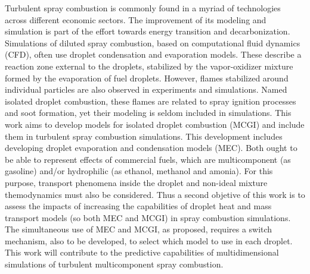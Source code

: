 {

\noindent %
Turbulent spray combustion is commonly found in a myriad of technologies across different economic sectors.
The improvement of its modeling and simulation is part of the effort towards energy transition and decarbonization.
Simulations of diluted spray combustion, based on computational fluid dynamics (CFD), often use droplet condensation and evaporation models.
These describe a reaction zone external to the droplets, stabilized by the vapor-oxidizer mixture formed by the evaporation of fuel droplets.
However, flames stabilized around individual particles are also observed in experiments and simulations.
Named isolated droplet combustion, these flames are related to spray ignition processes and soot formation, yet their modeling is seldom included in simulations. 
This work aims to develop models for isolated droplet combustion (MCGI) and include them in turbulent spray combustion simulations.
This development includes developing droplet evaporation and condensation models (MEC).
Both ought to be able to represent effects of commercial fuels, which are multicomponent (as gasoline) and/or hydrophilic (as ethanol, methanol and amonia).
For this purpose, transport phenomena inside the droplet and non-ideal mixture themodynamics must also be considered.
Thus a second objetive of this work is to assess the impacts of  increasing the capabilities of droplet heat and mass transport models (so both MEC and MCGI) in spray combustion simulations.
The simultaneous use of MEC and MCGI, as proposed, requires a switch mechanism, also to be developed, to select which model to use in each droplet.
This work will contribute to the predictive capabilities of multidimensional simulations of turbulent multicomponent spray combustion.

}